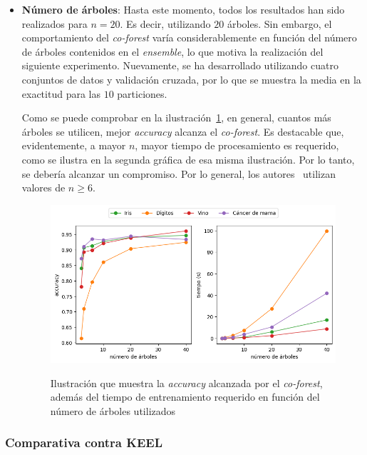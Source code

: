 \begin{itemize}
	\item{\textbf{Número de árboles}}: Hasta este momento, todos los resultados han sido realizados para $n=20$. Es decir, utilizando $20$ árboles. Sin embargo, el comportamiento del \textit{co-forest} varía considerablemente en función del número de árboles contenidos en el \textit{ensemble}, lo que motiva la realización del siguiente experimento. Nuevamente, se ha desarrollado utilizando cuatro conjuntos de datos y validación cruzada, por lo que se muestra la media en la exactitud para las $10$ particiones.
	
	Como se puede comprobar en la ilustración~\ref{cf:tt_trees}, en general, cuantos más árboles se utilicen, mejor \textit{accuracy} alcanza el \textit{co-forest}. Es destacable que, evidentemente, a mayor $n$, mayor tiempo de procesamiento es requerido, como se ilustra en la segunda gráfica de esa misma ilustración. Por lo tanto, se debería alcanzar un compromiso. Por lo general, los autores~\cite{originalCoForest2007} utilizan valores de $n \geq 6$.
	
	\begin{figure}[h]
		\caption[\textit{Co-Forest}: resultados (número de árboles)]{Ilustración que muestra la \textit{accuracy} alcanzada por el \textit{co-forest}, además del tiempo de entrenamiento requerido en función del número de árboles utilizados}
		\centering
		\includegraphics[scale=0.7]{../img/memoria/5_coforest_trees}
		\label{cf:tt_trees}
	\end{figure}
	
\end{itemize} 


\subsubsection{Comparativa contra KEEL}

